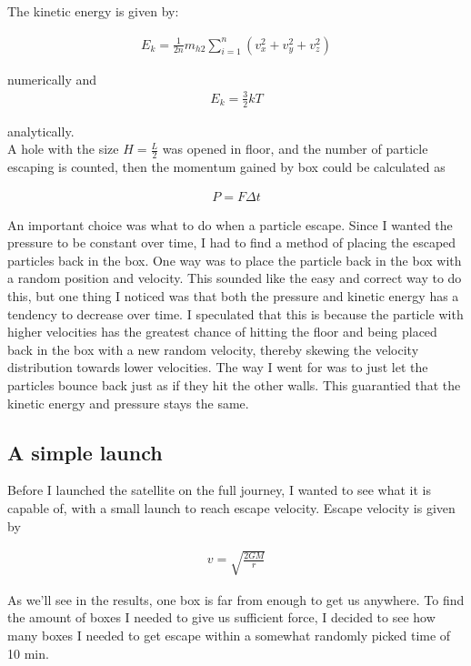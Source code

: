 \documentclass[a4paper, 10pt]{article}
\begin{document}
The kinetic energy is given by:

\begin{align}
E_k = \frac{1}{2n}m_{h2}\sum\limits_{i=1}^{n}(v_x^{2} + v_y^{2} + v_z^{2})
\end{align}

numerically and
\begin{align}
 E_k = \frac{3}{2}kT
\end{align}

analytically. \\

A hole with the size $H =\frac{L}{2}$ was opened in floor, and the number of particle escaping is counted, then the momentum gained by box could be  calculated as

\begin{align}
P = F \Delta t
\end{align}

An important choice was what to do when a particle escape. Since I wanted the pressure to be constant over time, I had to find a method of placing the escaped particles back in the box. One way was to place the particle back in the box with a random position and velocity. This sounded like the easy and correct way to do this, but one thing I noticed was that both the pressure and kinetic energy has a tendency to decrease over time. I speculated that this is because the particle with higher velocities has the greatest chance of hitting the floor and being placed back in the box with a new random velocity, thereby skewing the velocity distribution towards lower velocities. The way I went for was to just let the particles bounce back just as if they hit the other walls. This guarantied that the kinetic energy and pressure stays the same. 

\subsection{A simple launch}

Before I launched the satellite on the full journey, I wanted to see what it is capable of, with a small launch to reach escape velocity. Escape velocity is given by 

\begin{align}\label{eq:escape}
v = \sqrt{\frac{2GM}{r}}
\end{align}

As we'll see in the results, one box is far from enough to get us anywhere. To find the amount of boxes I needed to give us sufficient force, I decided to see how many boxes I needed to get escape within a somewhat randomly picked time of 10 min.
\end{document}
